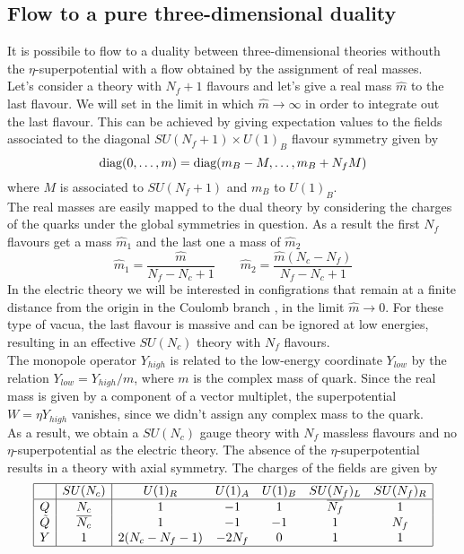 \subsection{Flow to a pure three-dimensional duality}
It is possibile to flow to a duality between three-dimensional theories withouth the $\eta$-superpotential with a flow obtained by the assignment of real masses.\\
Let's consider a theory with $N_f + 1$ flavours and let's give a real mass $\hat{m}$ to the last flavour.
We will set in the limit in which $\hat{m} \rightarrow \infty$ in order to integrate out the last flavour.
This can be achieved by giving expectation values to the fields associated to the diagonal $SU(N_f +1 ) \times U(1)_B$ flavour symmetry given by
\begin{equation}
  \hbox{diag}(0, \dots , m ) = \mbox{diag} (m_B - M, \dots , m_B + N_f M) 
   \end{equation}   
   where $M$ is associated to $SU(N_f+1)$ and $m_B$ to $U(1)_B$.\\
 The real masses are easily mapped to the dual theory by considering the charges of the quarks under the global symmetries in question.
 As a result the first $N_f$ flavours get a mass $\hat{m}_1$ and the last one a mass of $\hat{m}_2$
 \begin{equation}
  \hat{m}_1 = \frac{ \hat{m}}{N_f - N_c +1} \qquad \hat{m}_2 = \frac{ \hat{m} (N_c - N_f)}{N_f -N_c +1 }
 \end{equation}
In the electric theory we will be interested in configrations that remain at a finite distance from the origin in the Coulomb branch
, in the limit $\hat{m} \rightarrow 0 $.
For these type of vacua, the last flavour is massive and can be ignored at low energies, resulting in an effective $SU(N_c)$ theory with $N_f$ flavours.\\
The monopole operator $Y_{high}$ is related to the low-energy coordinate $Y_{low}$ by the relation $Y_{low} = Y_{high}/ m $, where $m$ is the complex mass of quark.
Since the real mass is given by a component of a vector multiplet, the superpotential $W = \eta Y_{high}$ vanishes, since we didn't assign any complex mass to the quark.\\
As a result, we obtain a $SU(N_c)$ gauge theory with $N_f$ massless flavours and no $\eta$-superpotential as the electric theory. 
The absence of the $\eta$-superpotential results in a theory with axial symmetry.
The charges of the fields are given by
\begin{equation}
\begin{array}{| c | c | c c c c c| }
 \hline 
  & SU(N_c) & U(1)_R & U(1)_A & U(1)_B  & SU(N_f)_L & SU(N_f)_R \\
 \hline

 Q &N_c & 1 & -1 & 1 & \overline{N_f} & 1 \\  
 \tilde{Q}& \overline{N_c} & 1  & -1 & -1  & 1 & {N_f}  \\  
 Y & 1 & 2(N_c - N_f -1 ) & -2 N_f  & 0 &  1 & 1 \\
 \hline
\end{array}
\end{equation}
